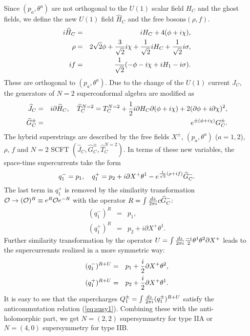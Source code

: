\documentclass[a4paper,12pt]{article}
\begin{document}
Since $(p_{a},\theta^{a})$ are not orthogonal to the $U(1)$ scalar field
$H_{C}$ and the ghost fields, we define the new $U(1)$ field
$\widehat{H}_{C}$ and the free bosons$(\rho, f)$.
\begin{eqnarray}
 i\widehat{H}_{C}&=&i H_{C}+4 (\phi+i \chi),
\nonumber\\
\rho&=&2\sqrt{2}\phi+{3\over\sqrt{2}}i\chi+{1\over\sqrt{2}}i H_{C}
+{1\over\sqrt{2}}i\sigma,
\nonumber\\
if&=&{1\over\sqrt{2}}(-\phi-i\chi+i H_{1}-i\sigma).
\end{eqnarray}
These are orthogonal to $(p_{a},\theta^{a})$.
Due to the change of the $U(1)$ current $J_{C}$, the generators of 
$N=2$ superconformal algebra are modified as 
\begin{eqnarray}
 \widehat{J}_{C}&=& i\partial \widehat{H}_{C},\quad
\widehat{T}^{N=2}_{C}=T^{N=2}_{C}+{1\over2} i\partial H_{C}\partial(\phi+i\chi)
+2 (\partial\phi+i\partial\chi)^2,
\nonumber\\
\widehat{G}^{\pm}_{C}&=&e^{\pm (\phi+i\chi)}G^{\pm}_{C}.
\end{eqnarray}
The hybrid superstrings are described by the free fields
$X^{\pm}$, $(p_{a},\theta^{a})$ ($a=1,2$), $\rho$, $f$ and 
$N=2$ SCFT $(\widehat{J}_{C}, \widehat{G}^{\pm}_{C},\widehat{T}^{N=2}_{C})$.
In terms of these new variables, the space-time supercurrents take the
form
\begin{equation}
 q^{-}_{1}= p_{1},
\quad
q^{+}_{1}= p_{2}+i\partial X^{+}\theta^{1}-e^{{1\over\sqrt{2}}(\rho+i f)}
\widehat{G}^{-}_{C}.
\label{eq:super1}
\end{equation}
The last term in $q^{+}_{1}$ is removed by the similarity transformation
${\cal O}\rightarrow 
({\cal O})^{R}\equiv e^{R}{\cal O} e^{-R}$ with the operator 
$R=\int {dz\over 2\pi i} c\widehat{G}^{-}_{C}$:
\begin{eqnarray}
 (q^{-}_{1})^{R}&=& p_{1},
\nonumber\\
(q^{+}_{1})^{R}&=& p_{2}+i\partial X^{+}\theta^{1}.
\label{eq:super2}
\end{eqnarray}
Further similarity transformation by the operator 
$U=\int {dz\over 2\pi i}{-i\over2}\theta^{1}\theta^{2}\partial X^{+}$
leads to the supercurrennts realized in a more symmetric way:
\begin{eqnarray}
 (q^{-}_{1})^{R+U}&=& p_{1}+{i\over2 }\partial X^{+}\theta^{2},
\nonumber\\
(q^{+}_{1})^{R+U}&=& p_{2}+{i\over2}\partial X^{+}\theta^{1}.
\label{eq:super3}
\end{eqnarray}
It is easy to see that the 
supercharges $Q^{\pm}_{1}=\int {dz\over 2\pi i}(q_{1}^{\pm})^{R+U}$ satisfy
the anticommutation relation (\ref{eq:susy1}).
Combining these with the anti-holomorphic part, we get $N=(2,2)$ 
supersymmetry
for type IIA or $N=(4,0)$ supersymmetry for type IIB.
\end{document}
